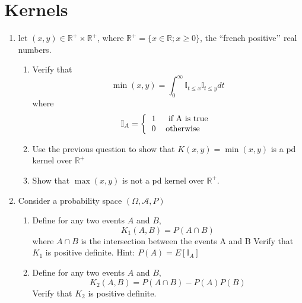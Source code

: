 \documentclass[11pt]{article}
\begin{document}
\section{Kernels}
\begin{enumerate}
\item let $(x,y) \in \mathbb{R}^+ \times \mathbb{R}^+$, where $\mathbb{R}^+=\{x \in \mathbb{R};x \geq 0\}$, the ``french positive\rq\rq{} real numbers. 
\begin{enumerate}
\item 
Verify that 
$$\min(x,y) = \int_0^\infty \mathbb{I}_{t\leq x} \mathbb{I}_{t\leq y} dt$$
where  
$$\mathbb{I}_A =  \left\{
\begin{tabular}{ll}
1 & \mbox{ if A is true}\\
0 & \mbox{otherwise}
\end{tabular}
\right.
$$ 

\item Use the previous question to show that $K(x,y)=\min(x,y)$ is a pd kernel over $\mathbb{R}^+$
\item Show that $\max(x,y)$ is not a pd kernel over  $\mathbb{R}^+$. 
\end{enumerate}
\item Consider a probability space $(\Omega,\mathcal{A},P)$
\begin{enumerate}
\item Define for any two events $A$ and $B$, 
$$K_1(A,B)=P(A \cap B)$$
where $A \cap B$ is the intersection between the events A and B 
Verify that $K_1$ is positive definite. Hint: $P(A)=E[\mathbb{I}_A]$
\item Define for any two events $A$ and $B$, 
$$K_2(A,B)=P(A \cap B)-P(A)P(B)$$
Verify that $K_2$ is positive definite. 
\end{enumerate}
\end{enumerate}
\end{document}
